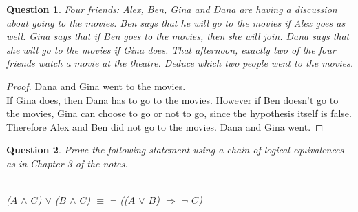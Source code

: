 \documentclass[11pt,oneside]{article}
\newtheorem{question}{Question}
\begin{document}
\newpage

\begin{question}
    Four friends: Alex, Ben, Gina and Dana are having a discussion about going to the movies. Ben says that he will go to the movies if Alex goes as well. Gina says that if Ben goes to the movies, then she will join. Dana says that she will go to the movies if Gina does. That afternoon, exactly two of the four friends watch a movie at the theatre. Deduce which two people went to the movies.
\end{question}

\begin{proof}
    Dana and Gina went to the movies. \\
    If Gina does, then Dana has to go to the movies. However if Ben doesn't go to the movies, Gina can choose to go or not to go, since the hypothesis itself is false. Therefore Alex and Ben did not go to the movies. Dana and Gina went. 
\end{proof}

\bigskip

\begin{question}
    Prove the following statement using a chain of logical equivalences as in Chapter 3 of the notes. \\
    \\
    \centerline{($A$ $\land$ $C$) $\lor$ ($B$ $\land$ $C$) $\equiv$ $\neg$ (($A$ $\lor$ $B$) $\Rightarrow$ $\neg$ $C$)}\
\end{question}
\end{document}
